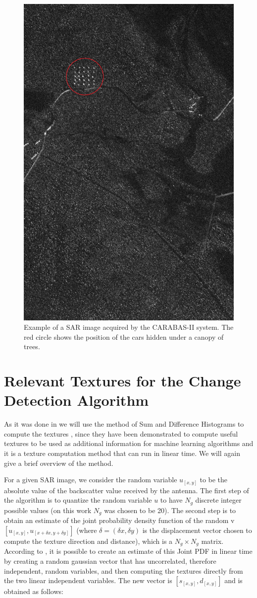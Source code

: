 \begin{figure}[ht]
    \centering
    \includegraphics[width=0.45\linewidth]{Chapter7/exemplo_carabas.jpg}
    \caption{ Example of a SAR image acquired by the CARABAS-II system.
    The red circle shows the position of the cars hidden under a canopy of trees.}
    \label{fig:exemplo_carabas}
\end{figure}

\section{Relevant Textures for the Change Detection Algorithm}
As it was done in \cite{Rodrigo} we will use the method of Sum and Difference Histograms to compute the textures \cite{Sarker,Sarker2}, since they have been demonstrated to compute 
useful textures to be used as additional information for machine learning algorithms and it is a texture computation method that can run in linear time. We will again give a brief overview of the method.

For a given SAR image, we consider the random variable $u_{[x, y]}$ to be the absolute value of the backscatter value received by the antenna. The first step of the algorithm is to 
quantize the random variable $u$ to have $N_g$ discrete integer possible values (on this work $N_g$ was chosen to be 20). The second step is to obtain an estimate of the joint probability density function of the random v $[u_{[x,y]}, u_{[x+\delta x, y+\delta y]}]$ (where $\delta = (\delta x, \delta y)$ is the displacement vector 
chosen to compute the texture direction and distance),
which is a $N_g \times N_g$ matrix. According to \cite{ Unser}, it is possible to create an estimate of this Joint PDF in linear time by creating a random gaussian vector that has uncorrelated, therefore independent, random variables, and then computing the textures 
directly from the two linear independent variables. The new vector is $[s_{[x,y]}, d_{[x, y]}]$ and is obtained as follows:

